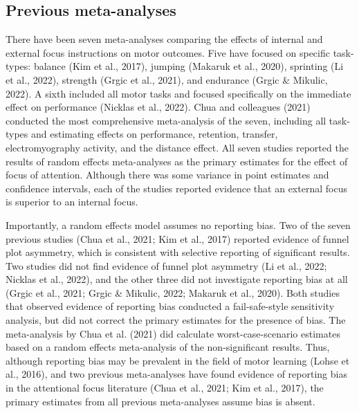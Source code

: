 \documentclass[
  man, donotrepeattitle,floatsintext]{apa7}
\begin{document}
\hypertarget{previous-meta-analyses}{%
\subsection{Previous meta-analyses}\label{previous-meta-analyses}}

There have been seven meta-analyses comparing the effects of internal and external focus instructions on motor outcomes. Five have focused on specific task-types: balance (Kim et al., 2017), jumping (Makaruk et al., 2020), sprinting (Li et al., 2022), strength (Grgic et al., 2021), and endurance (Grgic \& Mikulic, 2022). A sixth included all motor tasks and focused specifically on the immediate effect on performance (Nicklas et al., 2022). Chua and colleagues (2021) conducted the most comprehensive meta-analysis of the seven, including all task-types and estimating effects on performance, retention, transfer, electromyography activity, and the distance effect. All seven studies reported the results of random effects meta-analyses as the primary estimates for the effect of focus of attention. Although there was some variance in point estimates and confidence intervals, each of the studies reported evidence that an external focus is superior to an internal focus.

Importantly, a random effects model assumes no reporting bias. Two of the seven previous studies (Chua et al., 2021; Kim et al., 2017) reported evidence of funnel plot asymmetry, which is consistent with selective reporting of significant results. Two studies did not find evidence of funnel plot asymmetry (Li et al., 2022; Nicklas et al., 2022), and the other three did not investigate reporting bias at all (Grgic et al., 2021; Grgic \& Mikulic, 2022; Makaruk et al., 2020). Both studies that observed evidence of reporting bias conducted a fail-safe-style sensitivity analysis, but did not correct the primary estimates for the presence of bias. The meta-analysis by Chua et al. (2021) did calculate worst-case-scenario estimates based on a random effects meta-analysis of the non-significant results. Thus, although reporting bias may be prevalent in the field of motor learning (Lohse et al., 2016), and two previous meta-analyses have found evidence of reporting bias in the attentional focus literature (Chua et al., 2021; Kim et al., 2017), the primary estimates from all previous meta-analyses assume bias is absent.
\end{document}
